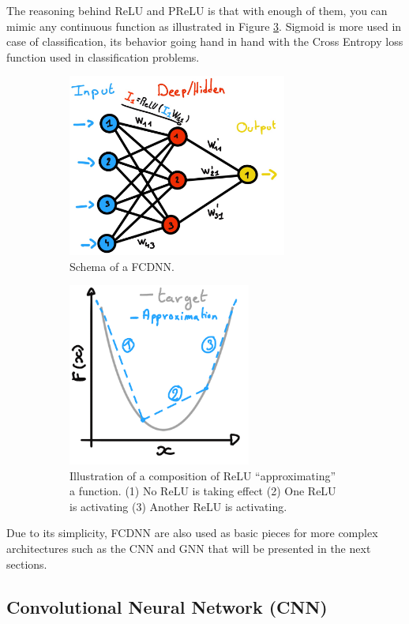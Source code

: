 \documentclass[../main.tex]{subfiles}
\begin{document}
The reasoning behind ReLU and PReLU is that with enough of them, you can mimic any continuous function as illustrated in Figure \ref{fig:ml:relu-mimic}. Sigmoid is more used in case of classification, its behavior going hand in hand with the Cross Entropy loss function used in classification problems.

\begin{figure}[ht]
  \begin{subfigure}[t]{0.48\textwidth}
    \centering
    \includegraphics[height=6cm]{images/ml/fcdnn_scheme.jpg}
    \caption{Schema of a FCDNN.}
    \label{fig:ml:fcdnn}
  \end{subfigure}
  \hfill
  \begin{subfigure}[t]{0.48\textwidth}
    \centering
    \includegraphics[height=6cm]{images/ml/relu_approx.png}
    \caption{Illustration of a composition of ReLU ``approximating'' a function. (1) No ReLU is taking effect (2) One ReLU is activating (3) Another ReLU is activating.}
    \label{fig:ml:relu-mimic}
  \end{subfigure}
  \caption{}
\end{figure}

Due to its simplicity, FCDNN are also used as basic pieces for more complex architectures such as the CNN and GNN that will be presented in the next sections.

\subsection{Convolutional Neural Network (CNN)}
\label{sec:ml:cnn}
\end{document}
